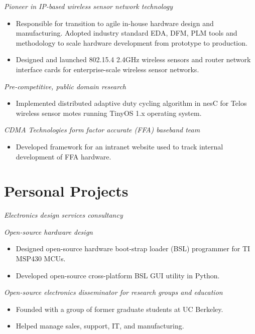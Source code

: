 \documentclass[11pt,a4paper]{moderncv}
\begin{document}
{
  \textit{Pioneer in IP-based wireless sensor network technology}
  \begin{itemize}
    \item Responsible for transition to agile in-house hardware design and manufacturing.  Adopted industry standard EDA, DFM, PLM tools and methodology to scale hardware development from prototype to production.
    \item Designed and launched 802.15.4 2.4GHz  wireless sensors and router network interface cards for enterprise-scale wireless sensor networks.
  \end{itemize}
}
{
  \textit{Pre-competitive, public domain research}
  \begin{itemize}
    \item Implemented distributed adaptive duty cycling algorithm in nesC for Telos wireless sensor motes running TinyOS 1.x operating system.
  \end{itemize}
}
{
  \textit{CDMA Technologies form factor accurate (FFA) baseband team}
  \begin{itemize}
    \item Developed framework for an intranet website used to track internal development of FFA hardware.
  \end{itemize}
}
\section{Personal Projects}
{
  \textit{Electronics design services consultancy}
}
{
  \textit{Open-source hardware design}
  \begin{itemize}
    \item Designed open-source hardware boot-strap loader (BSL) programmer for TI MSP430 MCUs.
    \item Developed open-source cross-platform BSL GUI utility in Python.
  \end{itemize}
}
{
  \textit{Open-source electronics disseminator for research groups and education}
  \begin{itemize}
    \item Founded with a group of former graduate students at UC Berkeley.
    \item Helped manage sales, support, IT, and manufacturing.
  \end{itemize}
}
\end{document}
